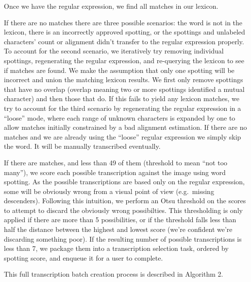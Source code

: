 \documentclass[ms,electronic,twosidetoc,letterpaper,chaptercenter,parttop,lof,lot]{byumsphd}
\begin{document}
Once we have the regular expression, we find all matches in our lexicon.

If there are no matches there are three possible scenarios: the word is not in the lexicon, there is an incorrectly approved spotting, or the spottings and unlabeled characters' count or alignment didn't transfer to the regular expression properly.
To account for the second scenario, we iteratively try removing individual spottings, regenerating the regular expression, and re-querying the lexicon to see if matches are found. We make the assumption that only one spotting will be incorrect and union the matching lexicon results. We first only remove spottings that have no overlap (overlap meaning two or more spottings identified a mutual character) and then those that do.
If this fails to yield any lexicon matches, we try to account for the third scenario by regenerating the regular expression in a ``loose'' mode, where each range of unknown characters is expanded by one to allow matches initially constrained by a bad alignment estimation.
If there are no matches and we are already using the ``loose'' regular expression we simply skip the word. It will be manually transcribed eventually.

If there are matches, and less than 49 of them (threshold to mean ``not too many''), we score each possible transcription against the image using word spotting.
As the possible transcriptions are based only on the regular expression, some will be obviously wrong from a visual point of view (e.g.~missing descenders). Following this intuition, we perform an Otsu threshold on the scores to attempt to discard the obviously wrong possibilties. This thresholding is only applied if there are more than 5 possibilities, or if the threshold falls less than half the distance between the highest and lowest score (we're confident we're discarding something poor).
If the resulting number of possible transcriptions is less than 7, we package them into a transcription selection task, ordered by spotting score, and enqueue it for a user to complete.

This full transcription batch creation process is described in Algorithm 2.
\end{document}
